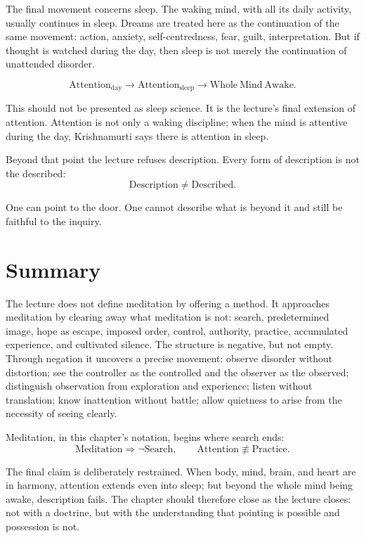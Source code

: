 The final movement concerns sleep. The waking mind, with all its daily activity, usually continues in sleep. Dreams are treated here as the continuation of the same movement: action, anxiety, self-centredness, fear, guilt, interpretation. But if thought is watched during the day, then sleep is not merely the continuation of unattended disorder.

\begin{equation}
\mathrm{Attention}_{\mathrm{day}}
\longrightarrow
\mathrm{Attention}_{\mathrm{sleep}}
\longrightarrow
\mathrm{Whole\ Mind\ Awake}.
\end{equation}

This should not be presented as sleep science. It is the lecture's final extension of attention. Attention is not only a waking discipline; when the mind is attentive during the day, Krishnamurti says there is attention in sleep.

Beyond that point the lecture refuses description. Every form of description is not the described:
\begin{equation}
\mathrm{Description} \neq \mathrm{Described}.
\end{equation}

One can point to the door. One cannot describe what is beyond it and still be faithful to the inquiry.

\section{Summary}

The lecture does not define meditation by offering a method. It approaches meditation by clearing away what meditation is not: search, predetermined image, hope as escape, imposed order, control, authority, practice, accumulated experience, and cultivated silence. The structure is negative, but not empty. Through negation it uncovers a precise movement: observe disorder without distortion; see the controller as the controlled and the observer as the observed; distinguish observation from exploration and experience; listen without translation; know inattention without battle; allow quietness to arise from the necessity of seeing clearly.

Meditation, in this chapter's notation, begins where search ends:
\begin{equation}
\mathrm{Meditation}
\Rightarrow
\neg \mathrm{Search},
\qquad
\mathrm{Attention}
\not\equiv
\mathrm{Practice}.
\end{equation}

The final claim is deliberately restrained. When body, mind, brain, and heart are in harmony, attention extends even into sleep; but beyond the whole mind being awake, description fails. The chapter should therefore close as the lecture closes: not with a doctrine, but with the understanding that pointing is possible and possession is not.